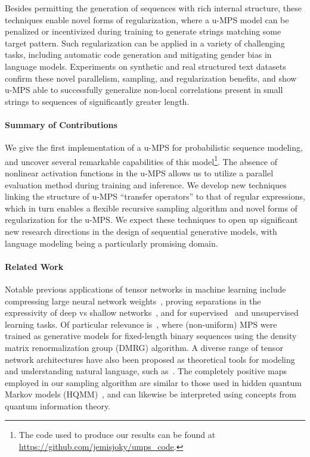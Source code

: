 \documentclass[twoside]{article}
\begin{document}
Besides permitting the generation of sequences with rich internal structure, these techniques enable novel forms of regularization, where a u-MPS model can be penalized or incentivized during training to generate strings matching some target pattern. Such regularization can be applied in a variety of challenging tasks, including automatic code generation and mitigating gender bias in language models. Experiments on synthetic and real structured text datasets confirm these novel parallelism, sampling, and regularization benefits, and show u-MPS able to successfully generalize non-local correlations present in small strings to sequences of significantly greater length.

\paragraph{Summary of Contributions}
We give the first implementation of a u-MPS for probabilistic sequence modeling, and uncover several remarkable capabilities of this model\footnote{The code used to produce our results can be found at \url{https://github.com/jemisjoky/umps_code}.}. The absence of nonlinear activation functions in the u-MPS allows us to utilize a parallel evaluation method during training and inference. We develop new techniques linking the structure of u-MPS ``transfer operators'' to that of regular expressions, which in turn enables a flexible recursive sampling algorithm and novel forms of regularization for the u-MPS. We expect these techniques to open up significant new research directions in the design of sequential generative models, with language modeling being a particularly promising domain.

\paragraph{Related Work}
Notable previous applications of tensor networks in machine learning include compressing large neural network weights~\citep{novikov2015}, proving separations in the expressivity of deep vs shallow networks~\citep{cohen2016}, and for supervised~\citep{stoudenmire2016, novikov2017, glasser2018} and unsupervised~\citep{han2018, stoudenmire2018, cheng2019} learning tasks. Of particular relevance is~\citep{stokes2019}, where (non-uniform) MPS were trained as generative models for fixed-length binary sequences using the density matrix renormalization group (DMRG) algorithm. A diverse range of tensor network architectures have also been proposed as theoretical tools for modeling and understanding natural language, such as~\citep{pestun2017, coecke2010, gallego2017, degiuli2019}. The completely positive maps employed in our sampling algorithm are similar to those used in hidden quantum Markov models (HQMM)~\citep{monras2010,srinivasan2018}, and can likewise be interpreted using concepts from quantum information theory.
\end{document}
